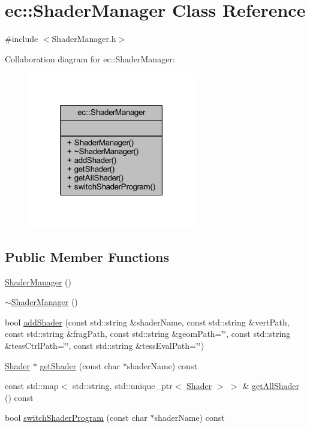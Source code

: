 \hypertarget{classec_1_1_shader_manager}{}\section{ec\+:\+:Shader\+Manager Class Reference}
\label{classec_1_1_shader_manager}


{\ttfamily \#include $<$Shader\+Manager.\+h$>$}



Collaboration diagram for ec\+:\+:Shader\+Manager\+:\nopagebreak
\begin{figure}[H]
\begin{center}
\leavevmode
\includegraphics[width=207pt]{classec_1_1_shader_manager__coll__graph}
\end{center}
\end{figure}
\subsection*{Public Member Functions}
\begin{DoxyCompactItemize}
\item 
\mbox{\hyperlink{classec_1_1_shader_manager_a6064ffe0b832b2744eeb83a6aef563b7}{Shader\+Manager}} ()
\item 
\mbox{\hyperlink{classec_1_1_shader_manager_afda0f442e5f6194cfd4253b9def34f0a}{$\sim$\+Shader\+Manager}} ()
\item 
bool \mbox{\hyperlink{classec_1_1_shader_manager_a81a63a18679d10c93e75b11ded25e8f0}{add\+Shader}} (const std\+::string \&shader\+Name, const std\+::string \&vert\+Path, const std\+::string \&frag\+Path, const std\+::string \&geom\+Path=\char`\"{}\char`\"{}, const std\+::string \&tess\+Ctrl\+Path=\char`\"{}\char`\"{}, const std\+::string \&tess\+Eval\+Path=\char`\"{}\char`\"{})
\item 
\mbox{\hyperlink{classec_1_1_shader}{Shader}} $\ast$ \mbox{\hyperlink{classec_1_1_shader_manager_a3e1390b9c15a6809ef07a10bac4112c7}{get\+Shader}} (const char $\ast$shader\+Name) const
\item 
const std\+::map$<$ std\+::string, std\+::unique\+\_\+ptr$<$ \mbox{\hyperlink{classec_1_1_shader}{Shader}} $>$ $>$ \& \mbox{\hyperlink{classec_1_1_shader_manager_aaff28268f21b821c048f351684a0213f}{get\+All\+Shader}} () const
\item 
bool \mbox{\hyperlink{classec_1_1_shader_manager_af42171dd2256a130b056d772e3190da0}{switch\+Shader\+Program}} (const char $\ast$shader\+Name) const
\end{DoxyCompactItemize}


